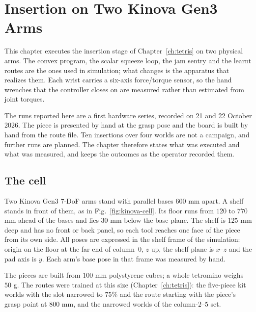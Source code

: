 \chapter{Insertion on Two Kinova Gen3 Arms}
\label{ch:kinova}

This chapter executes the insertion stage of Chapter~\ref{ch:tetris} on two physical arms. The convex program, the scalar squeeze loop, the jam sentry and the learnt routes are the ones used in simulation; what changes is the apparatus that realizes them. Each wrist carries a six-axis force/torque sensor, so the hand wrenches that the controller closes on are measured rather than estimated from joint torques.

The runs reported here are a first hardware series, recorded on 21 and 22 October 2026. The piece is presented by hand at the grasp pose and the board is built by hand from the route file. Ten insertions over four worlds are not a campaign, and further runs are planned. The chapter therefore states what was executed and what was measured, and keeps the outcomes as the operator recorded them.

\section{The cell}

Two Kinova Gen3 7-DoF arms stand with parallel bases $600$ mm apart. A shelf stands in front of them, as in Fig.~\ref{fig:kinova-cell}. Its floor runs from $120$ to $770$ mm ahead of the bases and lies $30$ mm below the base plane. The shelf is $125$ mm deep and has no front or back panel, so each tool reaches one face of the piece from its own side. All poses are expressed in the shelf frame of the simulation: origin on the floor at the far end of column~$0$, $z$ up, the shelf plane is $x$--$z$ and the pad axis is $y$. Each arm's base pose in that frame was measured by hand.


The pieces are built from $100$ mm polystyrene cubes; a whole tetromino weighs $50$ g. The routes were trained at this size (Chapter~\ref{ch:tetris}): the five-piece kit worlds with the slot narrowed to $75\%$ and the route starting with the piece's grasp point at $800$ mm, and the narrowed worlds of the column-$2$--$5$ set.

